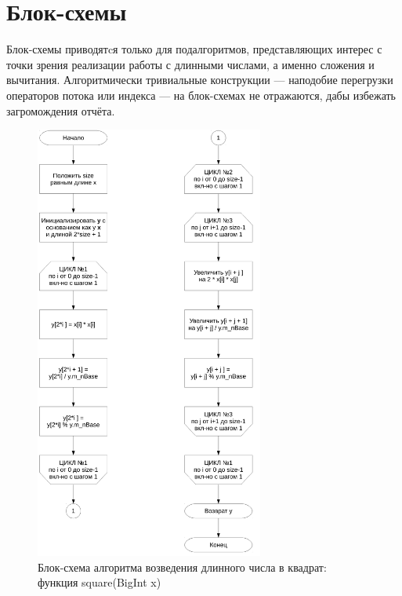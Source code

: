 \documentclass[a4paper,12pt]{article} %
\begin{document}



\section*{Блок-схемы}

Блок-схемы приводятcя только для подалгоритмов, представляющих интерес с точки зрения реализации работы с длинными числами,
а именно сложения и вычитания.
Алгоритмически тривиальные конструкции --- наподобие перегрузки операторов потока или индекса --- на блок-схемах не отражаются,
дабы избежать загромождения отчёта.

\begin{figure}[ht]
	\centering
	\includegraphics[width=0.67\textwidth]{lr2_square.pdf}
	\caption{Блок-схема алгоритма возведения длинного числа в квадрат: функция square(BigInt x)}
\end{figure}
\end{document}
